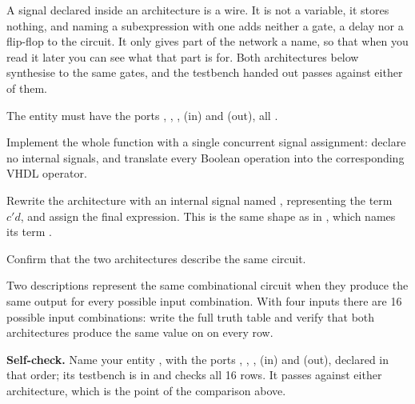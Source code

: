 A signal declared inside an architecture is a wire. It is not a variable, it stores nothing, and
naming a subexpression with one adds neither a gate, a delay nor a flip-flop to the circuit. It
only gives part of the network a name, so that when you read it later you can see what that part is
for. Both architectures below synthesise to the same gates, and the testbench handed out passes
against either of them.

The entity must have the ports , , ,  (in) and  (out), all
.

 Implement the whole function with a single concurrent signal assignment: declare no
internal signals, and translate every Boolean operation into the corresponding VHDL operator.

 Rewrite the architecture with an internal signal named , representing the term
$c'd$, and assign  the final expression. This is the same shape as  in
, which names its  term .

Confirm that the two architectures describe the same circuit.

\note[Hint]Two descriptions represent the same combinational circuit when they produce the same
output for every possible input combination. With four inputs there are 16 possible input
combinations: write the full truth table and verify that both architectures produce the same value
on  on every row.


\begin{selfcheck}
\textbf{Self-check.} Name your entity , with the ports , ,
,  (in) and  (out), declared in that order; its testbench is in
 and checks all 16 rows. It passes against either architecture, which
is the point of the comparison above.
\end{selfcheck}

